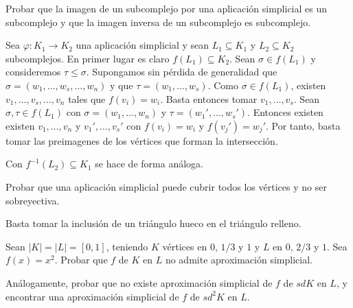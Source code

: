 \documentclass[twoside]{article}
\begin{document}
\begin{ejercicio}{1.15}
Probar que la imagen de un subcomplejo por una aplicación simplicial es un subcomplejo y que la imagen inversa de un subcomplejo es subcomplejo.
\end{ejercicio}
\begin{solucion}
Sea $\varphi:K_1\to K_2$ una aplicación simplicial y sean $L_1\subseteq K_1$ y $L_2\subseteq K_2$ subcomplejos. En primer lugar es claro $f(L_1)\subseteq K_2$. Sean $\sigma\in f(L_1)$ y consideremos $\tau\leq\sigma$. Supongamos sin pérdida de generalidad que $\sigma=(w_1,\dots, w_s, \dots, w_n)$ y que $\tau=(w_1,\dots, w_s)$. Como $\sigma\in f(L_1)$, existen $v_1,\dots, v_s,\dots, v_n$ tales que $f(v_i)=w_i$. Basta entonces tomar $v_1,\dots, v_s$. Sean $\sigma,\tau\in f(L_1)$ con $\sigma=(w_1,\dots, w_n)$ y $\tau=(w_1',\dots, w_s')$. Entonces existen existen $v_1,\dots, v_n$ y $v_1',\dots, v_s'$ con $f(v_i)=w_i$ y $f(v_j')=w_j'$. Por tanto, basta tomar las preimagenes de los vértices que forman la intersección.

Con $f^{-1}(L_2)\subseteq K_1$ se hace de forma análoga.
\end{solucion}

\newpage

\begin{ejercicio}{1.16}
Probar que una aplicación simplicial puede cubrir todos los vértices y no ser sobreyectiva.
\end{ejercicio}
\begin{solucion}
Basta tomar la inclusión de un triángulo hueco en el triángulo relleno.
\end{solucion}

\newpage

\begin{ejercicio}{1.17}
Sean $|K| = |L| = [0,1]$, teniendo $K$ vértices en $0$, $1/3$ y $1$ y $L$ en $0$, $2/3$ y $1$.
Sea $f(x) = x^2$. Probar que $f$ de $K$ en $L$ no admite aproximación simplicial.

Análogamente, probar que no existe aproximación simplicial de $f$ de $sd K$ en $L$, y encontrar una aproximación simplicial de $f$ de $sd^2 K$ en $L$.
\end{ejercicio}
\begin{solucion}
\end{solucion}
\end{document}
